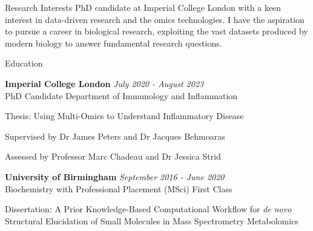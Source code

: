 \documentclass{resume}
\begin{document}
\begin{rSection}{Research Interests}
PhD candidate at Imperial College London with a keen interest in data-driven research and the omics technologies. I have the aspiration to pursue a career in biological research, exploiting the vast datasets produced by modern biology to answer fundamental research questions.

\end{rSection}
\begin{rSection}{Education}

\smallskip
{\bf Imperial College London} \hfill {\em July 2020 - August 2023} 
\\ PhD Candidate \hfill Department of Immunology and Inflammation

\smallskip
\item Thesis: Using Multi-Omics to Understand Inflammatory Disease
\item Supervised by Dr James Peters and Dr Jacques Behmoaras 
\item Assessed by Professor Marc Chadeau and Dr Jessica Strid

\medskip

{\bf University of Birmingham} \hfill {\em September 2016 - June 2020} 
\\ Biochemistry with Professional Placement (MSci) \hfill {First Class}

\smallskip
\item Dissertation: A Prior Knowledge-Based Computational Workflow for \textit{de novo} Structural Elucidation of Small Molecules in Mass Spectrometry Metabolomics

\end{rSection}

\end{document}
